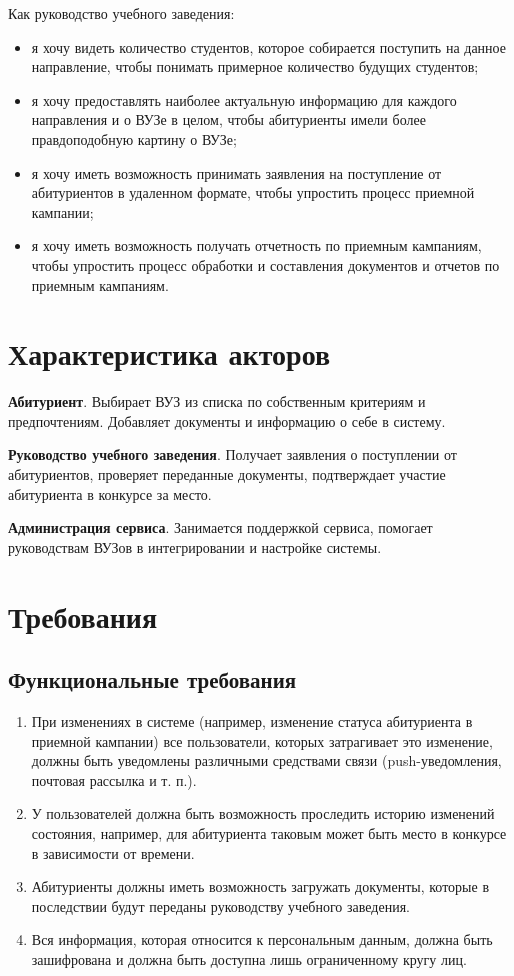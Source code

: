 \documentclass[a4paper, 14pt]{extarticle}
\begin{document}
Как руководство учебного заведения:
\begin{itemize}
  \item я хочу видеть количество студентов, которое собирается поступить на
  данное направление, чтобы понимать примерное количество будущих студентов;
  \item я хочу предоставлять наиболее актуальную информацию для каждого
  направления и о ВУЗе в целом, чтобы абитуриенты имели более правдоподобную
  картину о ВУЗе;
  \item я хочу иметь возможность принимать заявления на поступление от
  абитуриентов в удаленном формате, чтобы упростить процесс приемной кампании;
  \item я хочу иметь возможность получать отчетность по приемным кампаниям,
  чтобы упростить процесс обработки и составления документов и отчетов по
  приемным кампаниям.
\end{itemize}

\section{Характеристика акторов}

\textbf{Абитуриент}. Выбирает ВУЗ из списка по собственным критериям и
предпочтениям. Добавляет документы и информацию о себе в систему.

\textbf{Руководство учебного заведения}. Получает заявления о поступлении от
абитуриентов, проверяет переданные документы, подтверждает участие абитуриента в
конкурсе за место.

\textbf{Администрация сервиса}. Занимается поддержкой сервиса, помогает
руководствам ВУЗов в интегрировании и настройке системы.

\section{Требования}

\subsection{Функциональные требования}

\begin{enumerate}[leftmargin=*]
  \item При изменениях в системе (например, изменение статуса абитуриента в
  приемной кампании) все пользователи, которых затрагивает это изменение, должны
  быть уведомлены различными средствами связи (push-уведомления, почтовая
  рассылка и т. п.).
  \item У пользователей должна быть возможность проследить историю изменений
  состояния, например, для абитуриента таковым может быть место в конкурсе в
  зависимости от времени.
  \item Абитуриенты должны иметь возможность загружать документы, которые в
  последствии будут переданы руководству учебного заведения.
  \item Вся информация, которая относится к персональным данным, должна быть
  зашифрована и должна быть доступна лишь ограниченному кругу лиц.
\end{enumerate}
\end{document}
